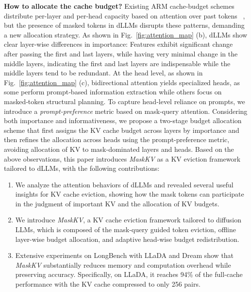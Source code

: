 \noindent \textbf{How to allocate the cache budget?} 
Existing ARM cache-budget schemes distribute per-layer and per-head capacity based on attention over past tokens  ~\citep{wang2024squeezeattention,feng2024ada}, but the presence of masked tokens in dLLMs disrupts these patterns, demanding a new allocation strategy.
As shown in Fig.~\ref{fig:attention_map} (b), dLLMs show  clear layer-wise differences in importance: Features exhibit significant change after passing the first and last layers, while having very minimal change in the middle layers, indicating the first and last layers are indispensable while the middle layers tend to be redundant. 
At the head level, as shown in Fig.~\ref{fig:attention_map} (c),  bidirectional attention yields specialized heads, as some perform prompt‑based information extraction while others focus on masked‑token structural planning.
To capture head-level reliance on prompts, we introduce a \emph{prompt-preference} metric based on mask-query attention.
Considering both importance and informativeness, we propose a two-stage budget allocation scheme that first assigns the KV cache budget across layers by importance and then refines the allocation across heads using the prompt-preference metric, avoiding allocation of KV to mask-dominated layers and heads.
Based on the above observations, this paper introduces \emph{MaskKV} as a KV eviction framework tailored to dLLMs, with the following contributions: 
\begin{enumerate}
\item
We analyze the attention behaviors of dLLMs and revealed several useful insights for KV cache eviction, showing how the mask tokens can participate in the judgment of important KV and the allocation of KV budgets.

\item 
We introduce  \emph{MaskKV}, a KV cache eviction framework tailored to diffusion LLMs, which is composed of the mask-query guided token eviction, offline layer-wise budget allocation, and adaptive head-wise budget redistribution.
\item Extensive experiments on LongBench with LLaDA and Dream show that \emph{MaskKV} substantially reduces memory and computation overhead while preserving accuracy. Specifically, on LLaDA, it reaches 94\% of the full-cache performance with the KV cache compressed to only 256 pairs.
\end{enumerate}
